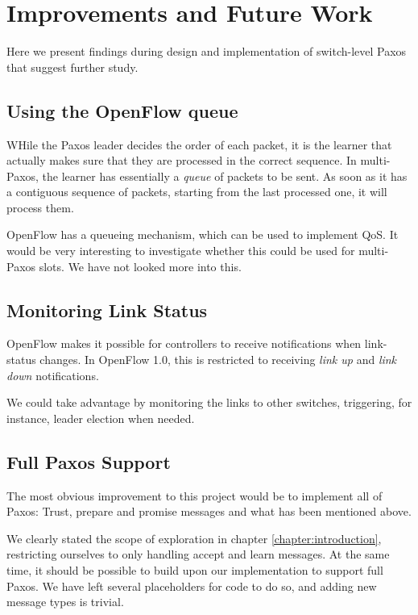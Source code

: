 \chapter{Improvements and Future Work}

Here we present findings during design and implementation of switch-level
Paxos that suggest further study.

\section{Using the OpenFlow queue}

WHile the Paxos leader decides the order of each packet, it is the learner
that actually makes sure that they are processed in the correct sequence.
%
In multi-Paxos, the learner has essentially a \textit{queue} of packets to
be sent.  As soon as it has a contiguous sequence of packets, starting from
the last processed one, it will process them.

OpenFlow has a queueing mechanism, which can be used to implement \ac{QoS}.
It would be very interesting to investigate whether this could be used for
multi-Paxos slots.  We have not looked more into this.

\section{Monitoring Link Status}

OpenFlow makes it possible for controllers to receive notifications when
link-status changes.  In OpenFlow 1.0, this is restricted
to receiving \textit{link up} and \textit{link down}
notifications.

We could take advantage by monitoring the links to other switches,
triggering, for instance, leader election when needed.

\section{Full Paxos Support}

The most obvious improvement to this project would be to implement all of
Paxos: Trust, prepare and
promise messages and what has been mentioned above.

We clearly stated the scope of exploration in chapter
\ref{chapter:introduction}, restricting ourselves to only handling accept
and learn messages.  At the same time, it should be possible to build upon
our implementation to support full Paxos.  We have left several placeholders
for code to do so, and adding new message types is trivial.
